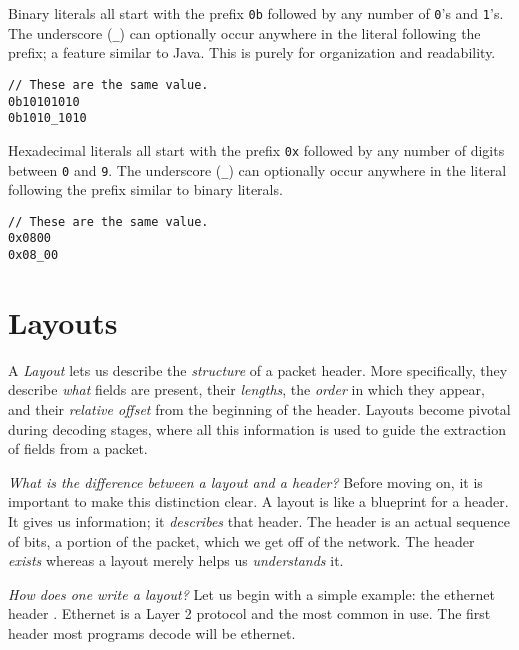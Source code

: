 Binary literals all start with the prefix \texttt{0b} followed by any number of \texttt{0}'s and \texttt{1}'s. The underscore (\texttt{\_}) can optionally occur anywhere in the literal following the prefix; a feature similar to Java. This is purely for organization and readability.

\begin{codepage}
\begin{lstlisting}
// These are the same value.
0b10101010
0b1010_1010
\end{lstlisting}
\end{codepage}

Hexadecimal literals all start with the prefix \texttt{0x} followed by any number of digits between \texttt{0} and \texttt{9}. The underscore (\texttt{\_}) can optionally occur anywhere in the literal following the prefix similar to binary literals.

\begin{codepage}
\begin{lstlisting}
// These are the same value.
0x0800
0x08_00
\end{lstlisting}
\end{codepage}

\section{Layouts} \label{tut:layout}

A \textit{Layout} lets us describe the \textit{structure} of a packet header. More specifically, they describe \textit{what} fields are present, their \textit{lengths}, the \textit{order} in which they appear, and their \textit{relative offset} from the beginning of the header. Layouts become pivotal during decoding stages, where all this information is used to guide the extraction of fields from a packet.

\textit{What is the difference between a layout and a header?} Before moving on, it is important to make this distinction clear. A layout is like a blueprint for a header. It gives us information; it \textit{describes} that header. The header is an actual sequence of bits, a portion of the packet, which we get off of the network. The header \textit{exists} whereas a layout merely helps us \textit{understands} it.

\textit{How does one write a layout?} Let us begin with a simple example: the ethernet header \cite{eth_std}. Ethernet is a Layer 2 \cite{osi_model} protocol and the most common in use. The first header most programs decode will be ethernet.

